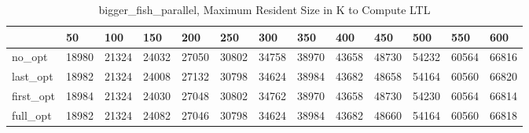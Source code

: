 \begin{table}
\caption{bigger\_fish\_parallel, Maximum Resident Size in K to Compute LTL}
\label{bigger_fish_parallel_LTL_size}
\begin{tabular}{lllllllllllll}
\toprule
 & 50 & 100 & 150 & 200 & 250 & 300 & 350 & 400 & 450 & 500 & 550 & 600 \\
\midrule
no\_opt & 18980 & 21324 & 24032 & 27050 & 30802 & 34758 & 38970 & 43658 & 48730 & 54232 & 60564 & 66816 \\
last\_opt & 18982 & 21324 & 24008 & 27132 & 30798 & 34624 & 38984 & 43682 & 48658 & 54164 & 60560 & 66820 \\
first\_opt & 18984 & 21324 & 24030 & 27048 & 30802 & 34762 & 38970 & 43658 & 48730 & 54230 & 60564 & 66814 \\
full\_opt & 18982 & 21324 & 24082 & 27046 & 30798 & 34624 & 38984 & 43682 & 48660 & 54164 & 60560 & 66818 \\
\bottomrule
\end{tabular}
\end{table}
